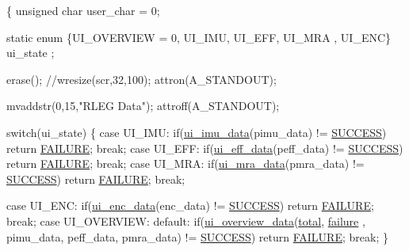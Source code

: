 \begin{DoxyCode}
\{
        \textcolor{keywordtype}{unsigned} \textcolor{keywordtype}{char} user\_char = 0;

        \textcolor{keyword}{static} \textcolor{keyword}{enum} \{UI\_OVERVIEW = 0, UI\_IMU, UI\_EFF, UI\_MRA , UI\_ENC\} ui\_state
      ;

        erase();
        \textcolor{comment}{//wresize(scr,32,100);}
        attron(A\_STANDOUT);

        mvaddstr(0,15,\textcolor{stringliteral}{"RLEG Data"});
        attroff(A\_STANDOUT);

        \textcolor{keywordflow}{switch}(ui\_state)
        \{
                \textcolor{keywordflow}{case} UI\_IMU:
                        \textcolor{keywordflow}{if}(\hyperlink{group__ui_ga7d5a9d9a75693709de408781d001a6a6}{ui\_imu\_data}(pimu\_data) != \hyperlink{calibration_2calibration_8h_aa90cac659d18e8ef6294c7ae337f6b58}{SUCCESS})
       \textcolor{keywordflow}{return} \hyperlink{calibration_2calibration_8h_a6d58f9ac447476b4e084d7ca383f5183}{FAILURE};
                        \textcolor{keywordflow}{break};
                \textcolor{keywordflow}{case} UI\_EFF:
                        \textcolor{keywordflow}{if}(\hyperlink{ui_8c_af48496a4ce54378764bc4ca9eddfd498}{ui\_eff\_data}(peff\_data) != \hyperlink{calibration_2calibration_8h_aa90cac659d18e8ef6294c7ae337f6b58}{SUCCESS})
       \textcolor{keywordflow}{return} \hyperlink{calibration_2calibration_8h_a6d58f9ac447476b4e084d7ca383f5183}{FAILURE};
                        \textcolor{keywordflow}{break};
                \textcolor{keywordflow}{case} UI\_MRA:
                        \textcolor{keywordflow}{if}(\hyperlink{group__ui_gaefec243c5df45db0350c1abbccf20e3b}{ui\_mra\_data}(pmra\_data) != \hyperlink{calibration_2calibration_8h_aa90cac659d18e8ef6294c7ae337f6b58}{SUCCESS})
       \textcolor{keywordflow}{return} \hyperlink{calibration_2calibration_8h_a6d58f9ac447476b4e084d7ca383f5183}{FAILURE};
                        \textcolor{keywordflow}{break};

                \textcolor{keywordflow}{case} UI\_ENC:
                        \textcolor{keywordflow}{if}(\hyperlink{ui_8c_a3821f6ba38465f8d170f7b947869e7d9}{ui\_enc\_data}(enc\_data) != \hyperlink{calibration_2calibration_8h_aa90cac659d18e8ef6294c7ae337f6b58}{SUCCESS}) \textcolor{keywordflow}{
      return} \hyperlink{calibration_2calibration_8h_a6d58f9ac447476b4e084d7ca383f5183}{FAILURE};
                        \textcolor{keywordflow}{break};
                \textcolor{keywordflow}{case} UI\_OVERVIEW:
                \textcolor{keywordflow}{default}:
                        \textcolor{keywordflow}{if}(\hyperlink{ui_8c_a8d5e19833fec51919aad6e78bb74619a}{ui\_overview\_data}(\hyperlink{main2_8c_ac7af894858cf396a219d632f40afdc8d}{total}, \hyperlink{main2_8c_a4f35e5ea2395561d0bd3b2f45612dc2c}{failure}
      , pimu\_data, peff\_data, pmra\_data) != \hyperlink{calibration_2calibration_8h_aa90cac659d18e8ef6294c7ae337f6b58}{SUCCESS}) \textcolor{keywordflow}{return} \hyperlink{calibration_2calibration_8h_a6d58f9ac447476b4e084d7ca383f5183}{FAILURE};
                        \textcolor{keywordflow}{break};
        \}


\end{DoxyCode}
